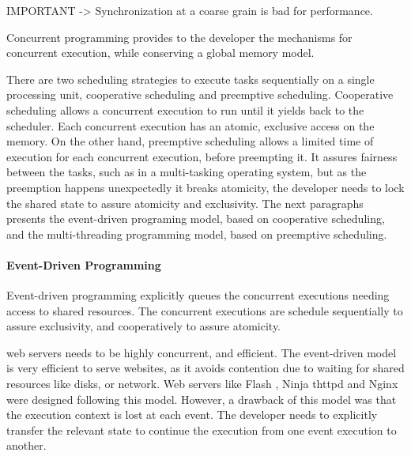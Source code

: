 
IMPORTANT -> Synchronization at a coarse grain is bad for performance.

Concurrent programming provides to the developer the mechanisms for concurrent execution, while conserving a global memory model.


There are two scheduling strategies to execute tasks sequentially on a single processing unit, cooperative scheduling and preemptive scheduling.
Cooperative scheduling allows a concurrent execution to run until it yields back to the scheduler.
Each concurrent execution has an atomic, exclusive access on the memory.
On the other hand, preemptive scheduling allows a limited time of execution for each concurrent execution, before preempting it.
It assures fairness between the tasks, such as in a multi-tasking operating system, but as the preemption happens unexpectedly it breaks atomicity, the developer needs to lock the shared state to assure atomicity and exclusivity.
The next paragraphs presents the event-driven programing model, based on cooperative scheduling, and the multi-threading programming model, based on preemptive scheduling.


\paragraph{Event-Driven Programming}

Event-driven programming explicitly queues the concurrent executions needing access to shared resources.
The concurrent executions are schedule sequentially to assure exclusivity, and cooperatively to assure atomicity.

web servers needs to be highly concurrent, and efficient.
The event-driven model is very efficient to serve websites, as it avoids contention due to waiting for shared resources like disks, or network.
Web servers like Flash \cite{Pai1999}, Ninja \cite{Gribble2001} thttpd and Nginx were designed following this model.
However, a drawback of this model was that the execution context is lost at each event.
The developer needs to explicitly transfer the relevant state to continue the execution from one event execution to another.

